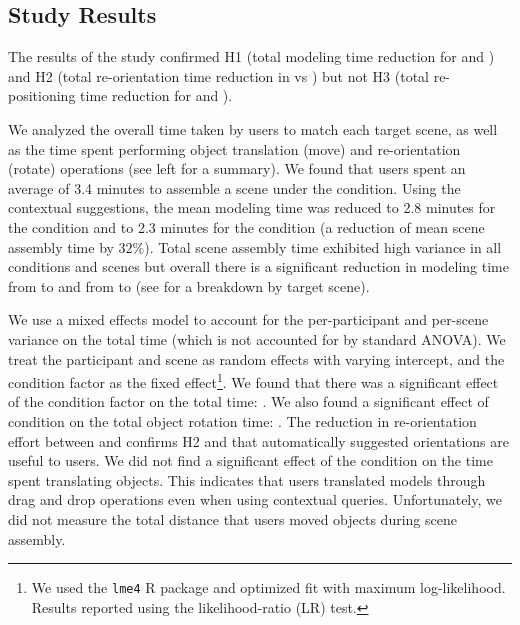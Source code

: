 \documentclass{sigchi}
\begin{document}
\subsection{Study Results}

The results of the study confirmed H1 (total modeling time reduction for \full and \basic) and H2 (total re-orientation time reduction in \full vs \basic) but not H3 (total re-positioning time reduction for \full and \basic).

We analyzed the overall time taken by users to match each target scene, as well as the time spent performing object translation (move) and re-orientation (rotate) operations (see  left for a summary).  We found that users spent an average of 3.4 minutes to assemble a scene under the \none condition.  Using the \SceneSuggest contextual suggestions, the mean modeling time was reduced to 2.8 minutes for the \basic condition and to 2.3 minutes for the \full condition (a reduction of mean scene assembly time by $32\%$).  Total scene assembly time exhibited high variance in all conditions and scenes but overall there is a significant reduction in modeling time from \none to \basic and from \basic to \full (see  for a breakdown by target scene).

We use a mixed effects model to account for the per-participant and per-scene variance on the total time (which is not accounted for by standard ANOVA).  We treat the participant and scene as random effects with varying intercept, and the condition factor as the fixed effect\footnote{We used the \texttt{lme4} R package and optimized fit with maximum log-likelihood. Results reported using the likelihood-ratio (LR) test.}.  We found that there was a significant effect of the condition factor on the total time: .  We also found a significant effect of condition on the total object rotation time: .  The reduction in re-orientation effort between \basic and \full confirms H2 and that automatically suggested orientations are useful to users.  We did not find a significant effect of the condition on the time spent translating objects.  This indicates that users translated models through drag and drop operations even when using contextual queries.  Unfortunately, we did not measure the total distance that users moved objects during scene assembly.
\end{document}
